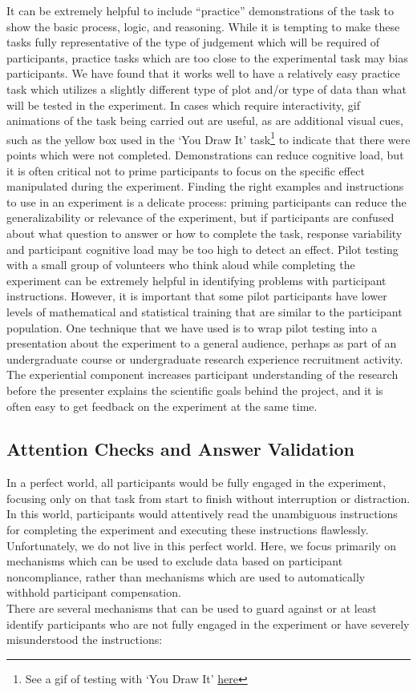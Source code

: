 \documentclass[
  10pt,
]{article}
\begin{document}
It can be extremely helpful to include ``practice'' demonstrations of
the task to show the basic process, logic, and reasoning. While it is
tempting to make these tasks fully representative of the type of
judgement which will be required of participants, practice tasks which
are too close to the experimental task may bias participants. We have
found that it works well to have a relatively easy practice task which
utilizes a slightly different type of plot and/or type of data than what
will be tested in the experiment. In cases which require interactivity,
gif animations of the task being carried out are useful, as are
additional visual cues, such as the yellow box used in the `You Draw It'
task\footnote{See a gif of testing with `You Draw It'
  \href{https://i.imgur.com/GM5YSen.gif}{here}} to indicate that there
were points which were not completed. Demonstrations can reduce
cognitive load, but it is often critical not to prime participants to
focus on the specific effect manipulated during the experiment. Finding
the right examples and instructions to use in an experiment is a
delicate process: priming participants can reduce the generalizability
or relevance of the experiment, but if participants are confused about
what question to answer or how to complete the task, response
variability and participant cognitive load may be too high to detect an
effect. Pilot testing with a small group of volunteers who think aloud
while completing the experiment can be extremely helpful in identifying
problems with participant instructions. However, it is important that
some pilot participants have lower levels of mathematical and
statistical training that are similar to the participant population. One
technique that we have used is to wrap pilot testing into a presentation
about the experiment to a general audience, perhaps as part of an
undergraduate course or undergraduate research experience recruitment
activity. The experiential component increases participant understanding
of the research before the presenter explains the scientific goals
behind the project, and it is often easy to get feedback on the
experiment at the same time.

\subsection{Attention Checks and Answer
Validation}\label{attention-checks-and-answer-validation}

In a perfect world, all participants would be fully engaged in the
experiment, focusing only on that task from start to finish without
interruption or distraction. In this world, participants would
attentively read the unambiguous instructions for completing the
experiment and executing these instructions flawlessly. Unfortunately,
we do not live in this perfect world. Here, we focus primarily on
mechanisms which can be used to exclude data based on participant
noncompliance, rather than mechanisms which are used to automatically
withhold participant compensation.\\
There are several mechanisms that can be used to guard against or at
least identify participants who are not fully engaged in the experiment
or have severely misunderstood the instructions:
\end{document}
